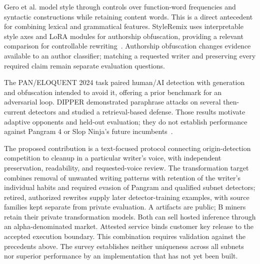 Gero et al. model style through controls over function-word frequencies
and syntactic constructions while retaining content words. This is a
direct antecedent for combining lexical and grammatical features.
StyleRemix uses interpretable style axes and LoRA modules for authorship
obfuscation, providing a relevant comparison for controllable
rewriting~\cite{linguisticcontrols,styleremix}. Authorship obfuscation
changes evidence available to an author classifier; matching a requested
writer and preserving every required claim remain separate evaluation
questions.

The PAN/ELOQUENT 2024 task paired human/AI detection with generation and
obfuscation intended to avoid it, offering a prior benchmark for an
adversarial loop. DIPPER demonstrated paraphrase attacks on several
then-current detectors and studied a retrieval-based defense. Those
results motivate adaptive opponents and held-out evaluation; they do
not establish performance against Pangram 4 or Slop Ninja's future
incumbents~\cite{pan2024,dipper}.

The proposed contribution is a text-focused protocol connecting
origin-detection competition to cleanup in a particular writer's voice,
with independent preservation, readability, and requested-voice review.
The transformation target combines removal of unwanted writing patterns
with retention of the writer's individual habits and required evasion
of Pangram and qualified subnet detectors;
retired, authorized rewrites supply later detector-training examples,
with source families kept separate from private evaluation.
A artifacts are public; B miners retain their private transformation
models. Both can sell hosted
inference through an alpha-denominated market. Attested service binds
customer key release to the accepted execution boundary. This
combination requires validation against the precedents above. The
survey establishes neither uniqueness across all subnets nor superior
performance by an implementation that has not yet been built.
